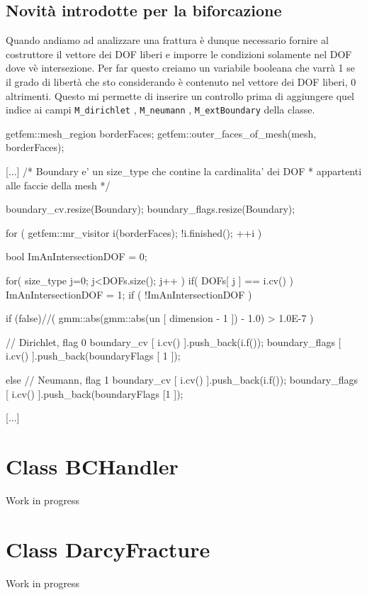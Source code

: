 \subsection{Novit\`{a} introdotte per la biforcazione}
Quando andiamo ad analizzare una frattura è dunque necessario fornire al costruttore il vettore dei DOF liberi e imporre le condizioni solamente nel DOF dove v\`{e} intersezione. Per far questo creiamo un variabile booleana che varr\`{a} 1 se il grado di libert\`{a} che sto considerando è contenuto nel vettore dei DOF liberi, 0 altrimenti. Questo mi permette di inserire un controllo prima di aggiungere quel indice ai campi \texttt{M\_dirichlet} , \texttt{M\_neumann} , \texttt{M\_extBoundary} della classe.
\begin{Code03_03}[caption={Classe \texttt{BC}}]
[...]

getfem::mesh_region borderFaces;
getfem::outer_faces_of_mesh(mesh, borderFaces);

[...]
/* Boundary e' un size_type che contine la cardinalita' dei DOF 
 * appartenti alle faccie della mesh */
 
boundary_cv.resize(Boundary);
boundary_flags.resize(Boundary);

for ( getfem::mr_visitor i(borderFaces); !i.finished(); ++i )
{
	bool ImAnIntersectionDOF = 0;
				
	for( size_type j=0; j<DOFs.size(); j++ )
	{
		if( DOFs[ j ] == i.cv() )
		{
			ImAnIntersectionDOF = 1;
		}
	}
	if ( !ImAnIntersectionDOF )
	{
	  if (false)//( gmm::abs(gmm::abs(un [ dimension - 1 ]) - 1.0) > 1.0E-7 )  
	  {				
		// Dirichlet, flag 0
		boundary_cv [ i.cv() ].push_back(i.f());
		boundary_flags [ i.cv() ].push_back(boundaryFlags [ 1 ]);
		
	  }
	  else
	  {
		// Neumann, flag 1
		boundary_cv [ i.cv() ].push_back(i.f());
		boundary_flags [ i.cv() ].push_back(boundaryFlags [1 ]);
	  }
	}
}

[...]
\end{Code03_03}



\section{Class BCHandler}

Work in progress

\section{Class DarcyFracture}

Work in progress

